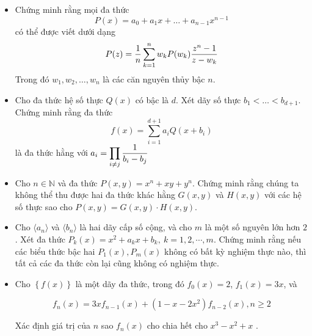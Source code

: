 \documentclass[11pt]{scrartcl}
\begin{document}
\begin{itemize}[label=, leftmargin=0em, itemsep=0.5em]
        \item \begin{btvn}
            Chứng minh rằng mọi đa thức 
            \[
                P(x) = a_0 + a_1x +\dots + a_{n - 1}x^{n - 1}
            \]
            có thể được viết dưới dạng
            \[
                P(z) = \frac{1}{n}\dsum_{k = 1}^n w_kP(w_k) \frac{z^n - 1}{z - w_k}
            \]
            Trong đó $w_1,w_2,\dots, w_n$ là các căn nguyên thủy bậc $n$.
        \end{btvn}

        \item \begin{btvn}
            Cho đa thức hệ số thực $Q(x)$ có bậc là $d$. Xét dãy số thực $b_1 < \dots < b_{d + 1}$. Chứng minh rằng đa thức
            \[
                f(x) = \sum_{i = 1}^{d + 1}a_iQ(x + b_i)
            \]
            là đa thức hằng với $a_i = \dprod_{i \neq j}\frac{1}{b_i - b_j}$
        \end{btvn}

        \item \begin{btvn}
            Cho $n\in\mathbb N$ và đa thức $P(x,y)=x^n+xy+y^n.$
            Chứng minh rằng chúng ta không thể thu được hai đa thức khác hằng $G(x,y)$ và $H(x,y)$ với các hệ số thực sao cho
            $P(x,y)=G(x,y)\cdot H(x,y).$
        \end{btvn}

        \item \begin{btvn}
            Cho $\langle a_n\rangle $ và $ \langle b_n\rangle$ là hai dãy cấp số cộng, và cho $m$ là một số nguyên lớn hơn $ 2$. Xét đa thức $P_k(x)=x^2+a_kx+b_k,\ k=1,2,\cdots, m.$ Chứng minh rằng nếu các biểu thức bậc hai $P_1(x), P_m(x)$  không có bất kỳ nghiệm thực nào, thì tất cả các đa thức còn lại cũng không có nghiệm thực.
        \end{btvn}

        \item \begin{btvn}
            Cho ${\left\{ {f(x)} \right\}}$ là một dãy đa thức, trong đó ${f_0}(x) = 2$, ${f_1}(x) = 3x$, và

            $${f_n}(x) = 3x{f_{n - 1}}(x) + (1 - x - 2{x^2}){f_{n - 2}}(x),n \ge 2$$

            Xác định giá trị của $n$ sao ${f_n}(x)$ cho chia hết cho $x^3-x^2+x$ .
        \end{btvn}


\end{itemize}
\end{document}
